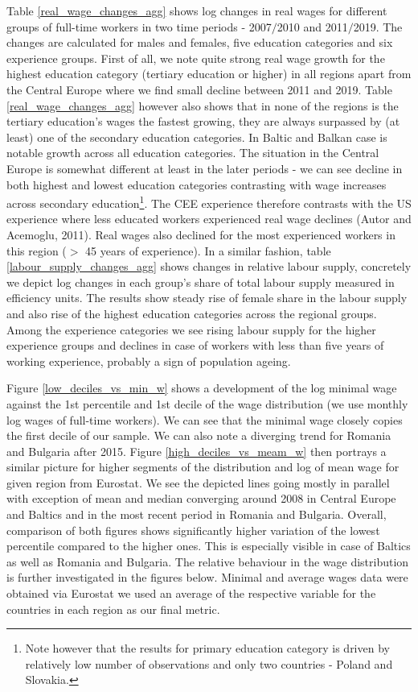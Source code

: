 \documentclass{article}
\begin{document}
Table \ref{real_wage_changes_agg} shows log changes in real wages for different groups of full-time workers in two time periods - 2007$/$2010 and 2011$/$2019. The changes are calculated for males and females, five education categories and six experience groups. First of all, we note quite strong real wage growth for the highest education category (tertiary education or higher) in all regions apart from the Central Europe where we find small decline between 2011 and 2019. Table \ref{real_wage_changes_agg} however also shows that in none of the regions is the tertiary education's wages the fastest growing, they are always surpassed by (at least) one of the secondary education categories. In Baltic and Balkan case is notable growth across all education categories. The situation in the Central Europe is somewhat different at least in the later periods - we can see decline in both highest and lowest education categories contrasting with wage increases across secondary education\footnote{Note however that the results for primary education category is driven by relatively low number of observations and only two countries - Poland and Slovakia.}. The CEE experience therefore contrasts with the US experience where less educated workers experienced real wage declines (Autor and Acemoglu, 2011).
Real wages also declined for the most experienced workers in this region ($>$ 45 years of experience).
In a similar fashion, table \ref{labour_supply_changes_agg} shows changes in relative labour supply, concretely we depict log changes in each group's share of total labour supply measured in efficiency units. The results show steady rise of female share in the labour supply and also rise of the highest education categories across the regional groups. Among the experience categories we see rising labour supply for the higher experience groups and declines in case of workers with less than five years of working experience, probably a sign of population ageing.

Figure \ref{low_deciles_vs_min_w} shows a development of the log minimal wage against the 1st percentile and 1st decile of the wage distribution (we use monthly log wages of full-time workers). We can see that the minimal wage closely copies the first decile of our sample. We can also note a diverging trend for Romania and Bulgaria after 2015. Figure \ref{high_deciles_vs_meam_w} then portrays a similar picture for higher segments of the distribution and log of mean wage for given region from Eurostat. We see the depicted lines going mostly in parallel with exception of mean and median converging around 2008 in Central Europe and Baltics and in the most recent period in Romania and Bulgaria. Overall, comparison of both figures shows significantly higher variation of the lowest percentile compared to the higher ones. This is especially visible in case of Baltics as well as Romania and Bulgaria. The relative behaviour in the wage distribution is further investigated in the figures below. Minimal and average wages data were obtained via Eurostat we used an average of the respective variable for the countries in each region as our final metric.
\end{document}
